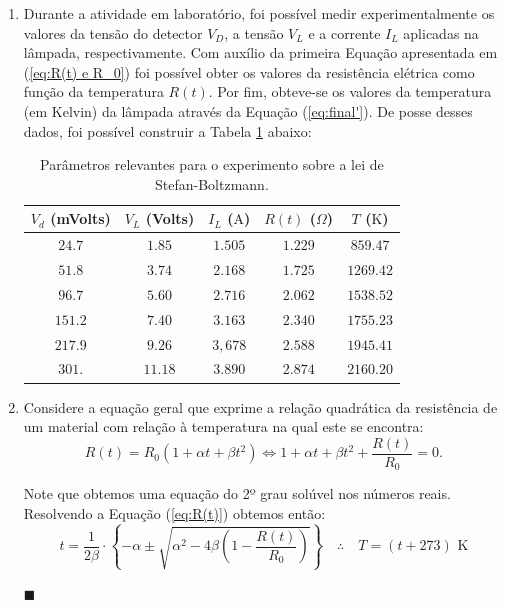 \documentclass[12pt,a4paper]{article}
\begin{document}
\begin{enumerate}
    \item Durante a atividade em laboratório, foi possível medir experimentalmente os valores da tensão do detector $V_D$, a tensão $V_L$ e a corrente $I_L$ aplicadas na lâmpada, respectivamente. Com auxílio da primeira Equação apresentada em (\ref{eq:R(t) e R_0}) foi possível obter os valores da resistência elétrica como função da temperatura $R(t)$. Por fim, obteve-se os valores da temperatura (em Kelvin) da lâmpada através da Equação (\ref{eq:final'}). De posse desses dados, foi possível construir a Tabela \ref{tab:Atv11c} abaixo:
    \begin{table}[htp!]
            \centering
            \caption{Parâmetros relevantes para o experimento sobre a lei de Stefan-Boltzmann.}
            \begin{tabular}{|c|c|c|c|c|}
            \hline
            $V_d$ (mVolts) & $V_L$ (Volts) & $I_L$ ($\text{A}$) & $R(t)$ ($\Omega$) & $T$ ($\text{K}$) \\
            \hline
            $24.7$ & $1.85$ & $1.505$ & $1.229$ & $859.47$  \\
            $51.8$ & $3.74$ & $2.168$ & $1.725$ & $1269.42$ \\
            $96.7$ & $5.60$ & $2.716$ & $2.062$ & $1538.52$ \\
            $151.2$ & $7.40$ & $3.163$ & $2.340$ & $1755.23$ \\
            $217.9$ & $9.26$ & $3,678$ & $2.588$ & $1945.41$ \\
            $301.$ & $11.18$ & $3.890$ & $2.874$ & $2160.20$ \\
                \hline
            \end{tabular}
            \label{tab:Atv11c}
        \end{table}
    


    \item Considere a equação geral que exprime a relação quadrática da resistência de um material com relação à temperatura na qual este se encontra:
    \begin{equation} \label{eq:R(t)}
        R(t)=R_0\left(1+\alpha t+\beta t^2\right)\iff 1+\alpha t+\beta t^2+\frac{R(t)}{R_0}=0.
    \end{equation}

    Note que obtemos uma equação do 2º grau solúvel nos números reais. Resolvendo a Equação (\ref{eq:R(t)}) obtemos então:
    \begin{equation} \label{eq:final'}
        t=\frac{1}{2\beta}\cdot\left\{-\alpha\pm\sqrt{\alpha^2-4\beta\left(1-\frac{R(t)}{R_0}\right)}\right\}\quad\therefore\quad\boxed{T=(t+273)\text{ K}}
    \end{equation}
    \begin{flushright}
        $\blacksquare$
    \end{flushright}
    
    
\end{enumerate}





\noindent\makebox[\linewidth]{\rule{\paperwidth}{0.4pt}}
\end{document}
